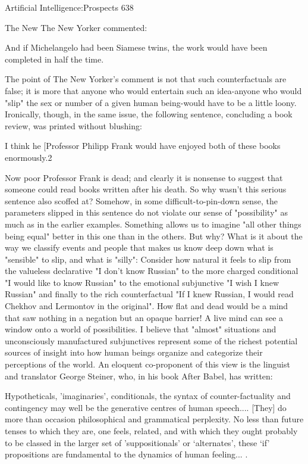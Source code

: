 Artificial Intelligence:Prospects                                                        638

The New The New Yorker commented:

   And if Michelangelo had been Siamese twins, the work would have been
   completed in half the time.

The point of The New Yorker's comment is not that such counterfactuals are false; it is
more that anyone who would entertain such an idea-anyone who would "slip" the sex or
number of a given human being-would have to be a little loony. Ironically, though, in the
same issue, the following sentence, concluding a book review, was printed without
blushing:

   I think he [Professor Philipp Frank would have enjoyed both of these books
   enormously.2

Now poor Professor Frank is dead; and clearly it is nonsense to suggest that someone
could read books written after his death. So why wasn't this serious sentence also scoffed
at? Somehow, in some difficult-to-pin-down sense, the parameters slipped in this
sentence do not violate our sense of "possibility" as much as in the earlier examples.
Something allows us to imagine "all other things being equal" better in this one than in
the others. But why? What is it about the way we classify events and people that makes
us know deep down what is "sensible" to slip, and what is "silly":
        Consider how natural it feels to slip from the valueless declarative "I don't know
Russian" to the more charged conditional "I would like to know Russian" to the
emotional subjunctive "I wish I knew Russian" and finally to the rich counterfactual "If I
knew Russian, I would read Chekhov and Lermontov in the original". How flat and dead
would be a mind that saw nothing in a negation but an opaque barrier! A live mind can
see a window onto a world of possibilities.
        I believe that "almost" situations and unconsciously manufactured subjunctives
represent some of the richest potential sources of insight into how human beings organize
and categorize their perceptions of the world.
An eloquent co-proponent of this view is the linguist and translator George
Steiner, who, in his book After Babel, has written:

   Hypotheticals, 'imaginaries', conditionals, the syntax of counter-factuality and
   contingency may well be the generative centres of human speech.... [They] do more
   than occasion philosophical and grammatical perplexity. No less than future tenses
   to which they are, one feels, related, and with which they ought probably to be
   classed in the larger set of 'suppositionals' or `alternates', these `if' propositions are
   fundamental to the dynamics of human feeling... .

